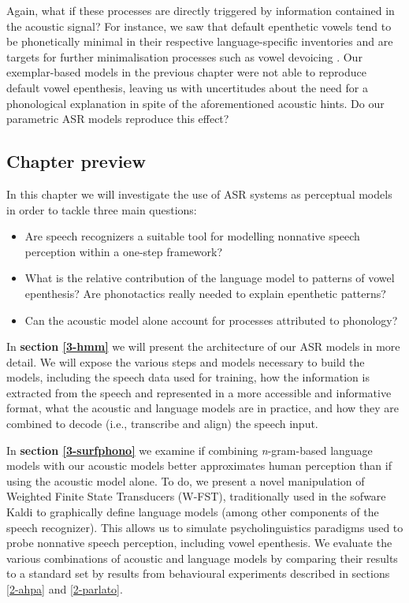 Again, what if these processes are directly triggered by information contained in the acoustic signal?
For instance, we saw that default epenthetic vowels tend to be phonetically minimal in their respective language-specific inventories \cite{guekozIS17} and are targets for further minimalisation processes such as vowel devoicing \cite{dupoux2011}. Our exemplar-based models in the previous chapter were not able to reproduce default vowel epenthesis, leaving us with uncertitudes about the need for a phonological explanation in spite of the aforementioned acoustic hints. Do our parametric ASR models reproduce this effect?  

\subsection{Chapter preview}
In this chapter we will investigate the use of ASR systems as perceptual models in order to tackle three main questions: 

\begin{itemize}
\item Are speech recognizers a suitable tool for modelling nonnative speech perception within a one-step framework?
\item What is the relative contribution of the language model to patterns of vowel epenthesis? Are phonotactics really needed to explain epenthetic patterns?
\item Can the acoustic model alone account for processes attributed to phonology? 
\end{itemize}

In \textbf{section \ref{3-hmm}} we will present the architecture of our ASR models in more detail. We will expose the various steps and models necessary to build the models, including the speech data used for training, how the information is extracted from the speech and represented in a more accessible and informative format, what the acoustic and language models are in practice, and how they are combined to decode (i.e., transcribe and align) the speech input.  

In \textbf{section \ref{3-surfphono}} we examine if combining \textit{n}-gram-based language models with our acoustic models better approximates human perception than if using the acoustic model alone. To do, we present a novel manipulation of Weighted Finite State Transducers (W-FST), traditionally used in the sofware Kaldi \cite{povey2011} to graphically define language models (among other components of the speech recognizer). This allows us to simulate psycholinguistics paradigms used to probe nonnative speech perception, including vowel epenthesis. We evaluate the various combinations of acoustic and language models by comparing their results to a standard set by results from behavioural experiments described in sections \ref{2-ahpa} and \ref{2-parlato}.  

